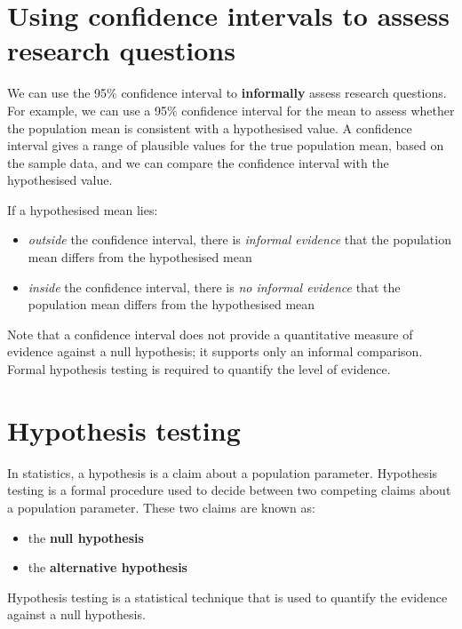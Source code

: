 \documentclass[
  a4paper,
]{memoir}
\providecommand{\tightlist}{%
  \setlength{\itemsep}{0pt}\setlength{\parskip}{0pt}}
\begin{document}
\section{Using confidence intervals to assess research
questions}\label{using-confidence-intervals-to-assess-research-questions}

We can use the 95\% confidence interval to \textbf{informally} assess
research questions. For example, we can use a 95\% confidence interval
for the mean to assess whether the population mean is consistent with a
hypothesised value. A confidence interval gives a range of plausible
values for the true population mean, based on the sample data, and we
can compare the confidence interval with the hypothesised value.

If a hypothesised mean lies:

\begin{itemize}
\tightlist
\item
  \emph{outside} the confidence interval, there is \emph{informal
  evidence} that the population mean differs from the hypothesised mean
\item
  \emph{inside} the confidence interval, there is \emph{no informal
  evidence} that the population mean differs from the hypothesised mean
\end{itemize}

Note that a confidence interval does not provide a quantitative measure
of evidence against a null hypothesis; it supports only an informal
comparison. Formal hypothesis testing is required to quantify the level
of evidence.

\section{Hypothesis testing}\label{hypothesis-testing}

In statistics, a hypothesis is a claim about a population parameter.
Hypothesis testing is a formal procedure used to decide between two
competing claims about a population parameter. These two claims are
known as:

\begin{itemize}
\tightlist
\item
  the \textbf{null hypothesis}
\item
  the \textbf{alternative hypothesis}
\end{itemize}

Hypothesis testing is a statistical technique that is used to quantify
the evidence against a null hypothesis.
\end{document}
